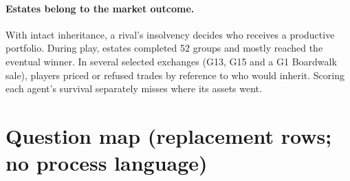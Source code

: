 \paragraph{Estates belong to the market outcome.} With intact inheritance, a rival's insolvency decides who receives a productive portfolio. During play, estates completed 52 groups and mostly reached the eventual winner. In several selected exchanges (G13, G15 and a G1 Boardwalk sale), players priced or refused trades by reference to who would inherit. Scoring each agent's survival separately misses where its assets went.

\section*{Question map (replacement rows; no process language)}

